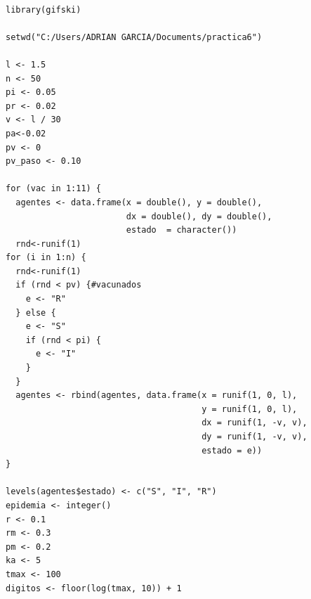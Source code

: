 \documentclass[a4paper]{article}
\begin{document}
\begin{lstlisting}

library(gifski)

setwd("C:/Users/ADRIAN GARCIA/Documents/practica6") 

l <- 1.5
n <- 50
pi <- 0.05
pr <- 0.02
v <- l / 30
pa<-0.02
pv <- 0 
pv_paso <- 0.10

for (vac in 1:11) {
  agentes <- data.frame(x = double(), y = double(),
                        dx = double(), dy = double(),
                        estado  = character())
  rnd<-runif(1)
for (i in 1:n) {
  rnd<-runif(1)
  if (rnd < pv) {#vacunados
    e <- "R"
  } else {
    e <- "S"
    if (rnd < pi) {
      e <- "I"
    }
  }
  agentes <- rbind(agentes, data.frame(x = runif(1, 0, l),
                                       y = runif(1, 0, l),
                                       dx = runif(1, -v, v),
                                       dy = runif(1, -v, v),
                                       estado = e))
}

levels(agentes$estado) <- c("S", "I", "R")
epidemia <- integer()
r <- 0.1
rm <- 0.3
pm <- 0.2
ka <- 5
tmax <- 100
digitos <- floor(log(tmax, 10)) + 1


\end{lstlisting}
\end{document}
